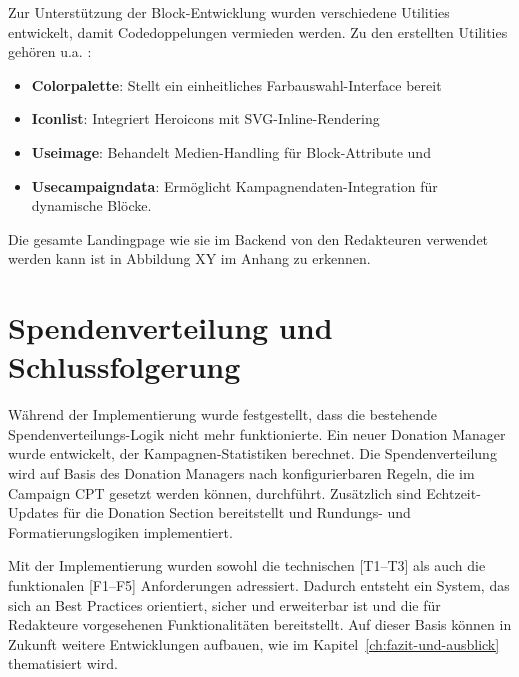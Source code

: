 Zur Unterstützung der Block-Entwicklung wurden verschiedene Utilities entwickelt, damit Codedoppelungen vermieden werden.
Zu den erstellten Utilities gehören u.a. :
\begin{itemize}
    \item \textbf{Colorpalette}: Stellt ein einheitliches Farbauswahl-Interface bereit
    \item \textbf{Iconlist}: Integriert Heroicons mit SVG-Inline-Rendering
    \item \textbf{Useimage}: Behandelt Medien-Handling für Block-Attribute und
    \item \textbf{Usecampaigndata}:  Ermöglicht Kampagnendaten-Integration für dynamische Blöcke.
\end{itemize}
Die gesamte Landingpage wie sie im Backend von den Redakteuren verwendet werden kann ist in Abbildung XY im Anhang zu erkennen. %

\section{Spendenverteilung und Schlussfolgerung}
Während der Implementierung wurde festgestellt, dass die bestehende Spendenverteilungs-Logik nicht mehr funktionierte.
Ein neuer Donation Manager wurde entwickelt, der Kampagnen-Statistiken berechnet.
Die Spendenverteilung wird auf Basis des Donation Managers nach konfigurierbaren Regeln, die im Campaign CPT gesetzt werden können, durchführt.
Zusätzlich sind Echtzeit-Updates für die Donation Section bereitstellt und Rundungs- und Formatierungslogiken implementiert.

Mit der Implementierung wurden sowohl die technischen [T1–T3] als auch die funktionalen [F1–F5] Anforderungen adressiert.
Dadurch entsteht ein System, das sich an Best Practices orientiert, sicher und erweiterbar ist und die für Redakteure vorgesehenen Funktionalitäten bereitstellt.
Auf dieser Basis können in Zukunft weitere Entwicklungen aufbauen, wie im Kapitel~\ref{ch:fazit-und-ausblick} thematisiert wird.
